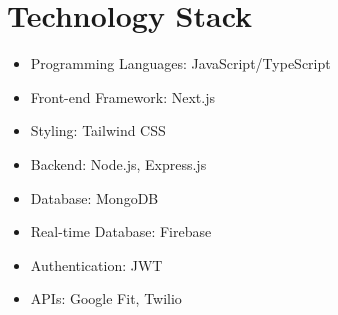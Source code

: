 \section{Technology Stack}
\begin{itemize}
    \item Programming Languages: JavaScript/TypeScript
    \item Front-end Framework: Next.js
    \item Styling: Tailwind CSS
    \item Backend: Node.js, Express.js
    \item Database: MongoDB
    \item Real-time Database: Firebase
    \item Authentication: JWT
    \item APIs: Google Fit, Twilio
\end{itemize}



